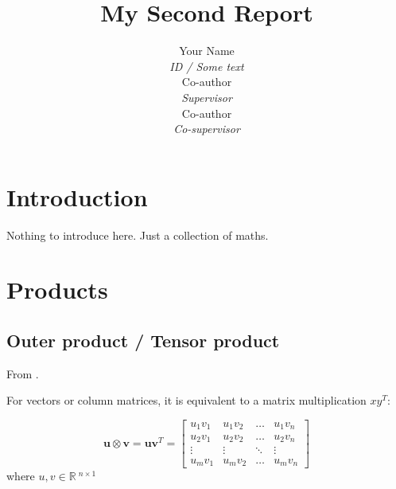 \documentclass{article}
\title{My Second Report}
\author{Your Name \\ \textit{ID / Some text} \\ \AND
        Co-author \\ \textit{Supervisor} \\ \AND
        Co-author \\ \textit{Co-supervisor}}
\begin{document}
\maketitle

\tableofcontents
\listoffigures
\listoftables
\clearpage



\section{Introduction}
\label{sec: Introduction}

Nothing to introduce here. Just a collection of maths.





\section{Products}
\label{sec: Products}


\subsection[Outer product]{Outer product / Tensor product}
\label{subsec: Outer product}

From \cite{wiki2019outerProd}.

For vectors or column matrices, it is equivalent to a matrix multiplication $x y^{T}$:

\begin{equation}
    \mathbf{u} \otimes \mathbf{v} = \mathbf{u} \mathbf{v}^{T} = \left[ \begin{array}{cccc}{u_{1} v_{1}} & {u_{1} v_{2}} & {\ldots} & {u_{1} v_{n}} \\ {u_{2} v_{1}} & {u_{2} v_{2}} & {\dots} & {u_{2} v_{n}} \\ {\vdots} & {\vdots} & {\ddots} & {\vdots} \\ {u_{m} v_{1}} & {u_{m} v_{2}} & {\ldots} & {u_{m} v_{n}}\end{array}\right]
\end{equation}
\noindent
where $u, v \in\mathbb{R}\:^{n \times 1}$
\end{document}
